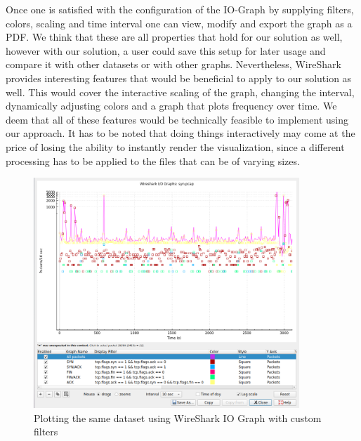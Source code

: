 Once one is satisfied with the configuration of the IO-Graph by supplying filters, colors, scaling and time interval one can view, modify and export the graph as a PDF. We think that these are all properties that hold for our solution as well, however with our solution, a user could save this setup for later usage and compare it with other datasets or with other graphs. Nevertheless, WireShark provides interesting features that would be beneficial to apply to our solution as well. This would cover the interactive scaling of the graph, changing the interval, dynamically adjusting colors and a graph that plots frequency over time. We deem that all of these features would be technically feasible to implement using our approach. It has to be noted that doing things interactively may come at the price of losing the ability to instantly render the visualization, since a different processing has to be applied to the files that can be of varying sizes.

\begin{figure}[]
    \centering
    \includegraphics[width=10cm]{images/evaluation_wireshark_iograph_synflood.png}
    \caption{Plotting the same dataset using WireShark IO Graph with custom filters}
    \label{fig:synvisualizationwireshark}
\end{figure}

